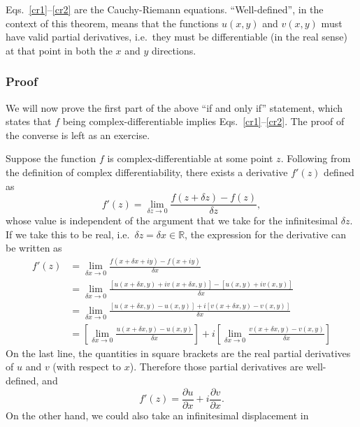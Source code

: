 \documentclass[10pt,a4paper]{article}
\begin{document}
\noindent
Eqs.~\eqref{cr1}--\eqref{cr2} are the Cauchy-Riemann
equations. ``Well-defined'', in the context of this theorem, means
that the functions $u(x,y)$ and $v(x,y)$ must have valid partial
derivatives, i.e.~they must be differentiable (in the real sense) at
that point in both the $x$ and $y$ directions.

\subsubsection{Proof}\label{proof}

We will now prove the first part of the above ``if and only if''
statement, which states that $f$ being complex-differentiable implies
Eqs.~\eqref{cr1}--\eqref{cr2}. The proof of the converse is left as an
exercise.

Suppose the function $f$ is complex-differentiable at some point
$z$. Following from the definition of complex differentiability, there
exists a derivative $f'(z)$ defined as
\begin{equation}
f'(z) = \lim_{\delta z \rightarrow 0} \frac{f(z+\delta z) - f(z)}{\delta z},
\end{equation}
whose value is independent of the argument that we take for the
infinitesimal $\delta z$. If we take this to be real,
i.e.~$\delta z = \delta x \in \mathbb{R}$, the expression for the
derivative can be written as
\begin{align}
  f'(z) &= \lim_{\delta x \rightarrow 0} \frac{f(x+\delta x + i y) - f(x + i y)}{\delta x} \\
  &= \lim_{\delta x \rightarrow 0} \frac{\left[u(x+\delta x, y) + iv(x+\delta x, y)\right] - \left[u(x, y) + i v(x,y)\right]}{\delta x}\\
  &= \lim_{\delta x \rightarrow 0} \frac{\left[u(x+\delta x, y) - u(x,y)\right] + i \left[v(x+\delta x, y)-v(x,y)\right]}{\delta x} \\
  &= \left[ \lim_{\delta x \rightarrow 0} \frac{u(x+\delta x, y) - u(x,y)}{\delta x}\right] + i \left[ \lim_{\delta x \rightarrow 0} \frac{v(x+\delta x, y) - v(x,y)}{\delta x}\right]
\end{align}
On the last line, the quantities in square brackets are the real
partial derivatives of $u$ and $v$ (with respect to $x$). Therefore
those partial derivatives are well-defined, and
\begin{equation}
f'(z) = \frac{\partial u}{\partial x} + i \frac{\partial v}{\partial x}.
\end{equation}
On the other hand, we could also take an infinitesimal displacement in
\end{document}

